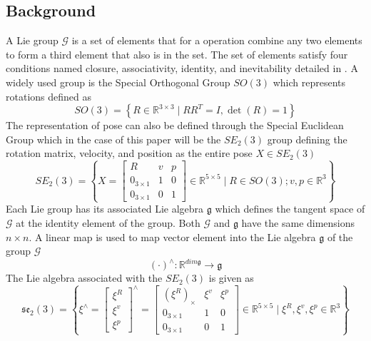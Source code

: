 \subsection{Background}
A Lie group $\mathcal{G}$ is a set of elements that for a operation combine any two elements to form a third element that also is in the set. The set of elements satisfy four conditions named closure, associativity, identity, and inevitability detailed in \cite{book}. A widely used group is the Special Orthogonal Group $SO(3)$ which represents rotations defined as \cite{book}
\begin{equation}
    SO(3)=\left\{R \in \mathbb{R}^{3 \times 3} \mid R R^T=I, \operatorname{det} (R)=1\right\}
    \label{eq: SO3 group}
\end{equation}
The representation of pose can also be defined through the Special Euclidean Group which in the case of this paper will be the $SE_2(3)$ group defining the rotation matrix, velocity, and position as the entire pose $X \in SE_2(3)$
\begin{equation}
    SE_2(3) = \left\{X = \begin{bmatrix}
    R & v & p\\
    0_{3 \times 1} & 1 & 0\\
    0_{3 \times 1} & 0 & 1
    \end{bmatrix} \in \mathbb{R}^{5 \times 5}
    \mid R \in SO(3); v, p \in \mathbb{R}^3\right\}
    \label{eq: SE3_2 group}
\end{equation}
Each Lie group has its associated Lie algebra $\mathfrak{g}$ which defines the tangent space of $\mathcal{G}$ at the identity element of the group. Both $\mathcal{G}$ and $\mathfrak{g}$ have the same dimensions $n \times n$. A linear map is used to map vector element into the Lie algebra $\mathfrak{g}$ of the group $\mathcal{G}$ \cite{Contact-Aided_Invarant_EKF}
\begin{equation}
    (\cdot)^{\wedge}: \mathbb{R}^{dim \mathfrak{g}} \rightarrow \mathfrak{g}
    \label{eq: linear map to g}
\end{equation}
The Lie algebra associated with the $SE_2(3)$ is given as 
\begin{equation}
    \mathfrak{s e}_2(3) =\left\{\xi^{\wedge} = 
    \begin{bmatrix}
         \xi^R \\
         \xi^v \\
         \xi^p
    \end{bmatrix}^{\wedge}
        =\begin{bmatrix}
    (\xi^R)_{\times} & \xi^v & \xi^p\\
    0_{3 \times 1} & 1 & 0\\
    0_{3 \times 1}  & 0 & 1
    \end{bmatrix} \in \mathbb{R}^{5 \times 5}
    \mid \xi^R, \xi^v, \xi^p \in \mathbb{R}^3\right\}
    \label{eq: se_2(3) lie algebra}
\end{equation}
